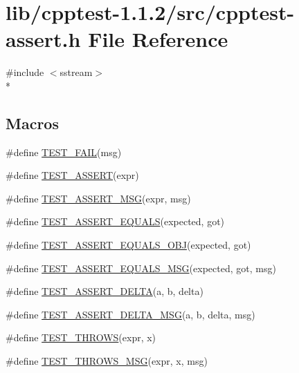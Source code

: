 \hypertarget{cpptest-assert_8h}{}\section{lib/cpptest-\/1.1.2/src/cpptest-\/assert.h File Reference}
\label{cpptest-assert_8h}
{\ttfamily \#include $<$sstream$>$}\\*
\subsection*{Macros}
\begin{DoxyCompactItemize}
\item 
\#define \hyperlink{cpptest-assert_8h_a947ab44cc42369eb7cfe33f8a1e38e4b}{T\+E\+S\+T\+\_\+\+F\+A\+IL}(msg)
\item 
\#define \hyperlink{cpptest-assert_8h_ac7dd7b06eb85d9ad841d80cbf217b1f6}{T\+E\+S\+T\+\_\+\+A\+S\+S\+E\+RT}(expr) 	
\item 
\#define \hyperlink{cpptest-assert_8h_ac612ede938734f9c8d898e05818882fb}{T\+E\+S\+T\+\_\+\+A\+S\+S\+E\+R\+T\+\_\+\+M\+SG}(expr,  msg)
\item 
\#define \hyperlink{cpptest-assert_8h_ae281f4d973e657b11691a97551f17dd1}{T\+E\+S\+T\+\_\+\+A\+S\+S\+E\+R\+T\+\_\+\+E\+Q\+U\+A\+LS}(expected,  got)
\item 
\#define \hyperlink{cpptest-assert_8h_aa506d98e8a5fc575df0361906f7deef8}{T\+E\+S\+T\+\_\+\+A\+S\+S\+E\+R\+T\+\_\+\+E\+Q\+U\+A\+L\+S\+\_\+\+O\+BJ}(expected,  got)
\item 
\#define \hyperlink{cpptest-assert_8h_ab8e9ce729f96abe74b76d98f9568a59c}{T\+E\+S\+T\+\_\+\+A\+S\+S\+E\+R\+T\+\_\+\+E\+Q\+U\+A\+L\+S\+\_\+\+M\+SG}(expected,  got,  msg)
\item 
\#define \hyperlink{cpptest-assert_8h_a9583b1709f4b9dfb3ff2849bfec5c885}{T\+E\+S\+T\+\_\+\+A\+S\+S\+E\+R\+T\+\_\+\+D\+E\+L\+TA}(a,  b,  delta)
\item 
\#define \hyperlink{cpptest-assert_8h_afcd749452840bfde9be575ef22fcede0}{T\+E\+S\+T\+\_\+\+A\+S\+S\+E\+R\+T\+\_\+\+D\+E\+L\+T\+A\+\_\+\+M\+SG}(a,  b,  delta,  msg)
\item 
\#define \hyperlink{cpptest-assert_8h_a5174c5f93519d5726c8993b2f36d6ceb}{T\+E\+S\+T\+\_\+\+T\+H\+R\+O\+WS}(expr,  x)
\item 
\#define \hyperlink{cpptest-assert_8h_a1ce6abe9e9134ce993840a648673e0f2}{T\+E\+S\+T\+\_\+\+T\+H\+R\+O\+W\+S\+\_\+\+M\+SG}(expr,  x,  msg)
\item 

\end{DoxyCompactItemize}
